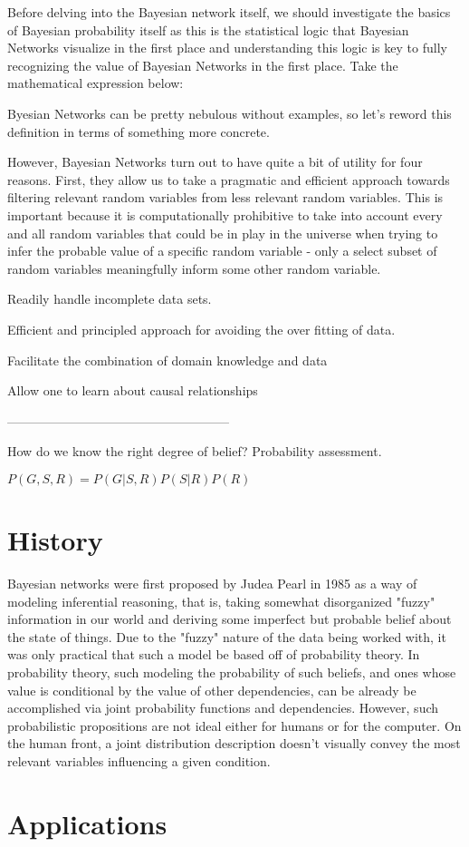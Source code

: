 \documentclass{article}
\begin{document}
Before delving into the Bayesian network itself, we should investigate the basics of Bayesian probability itself as this is the statistical logic that Bayesian Networks visualize in the first place and understanding this logic is key to fully recognizing the value of Bayesian Networks in the first place. Take the mathematical expression below:


Byesian Networks can be pretty nebulous without examples, so let's reword this definition in terms of something more concrete.

However, Bayesian Networks turn out to have quite a bit of utility for four reasons\cite{}. First, they allow us to take a pragmatic and efficient approach towards filtering relevant random variables from less relevant random variables. This is important because it is computationally prohibitive to take into account every and all random variables that could be in play in the universe when trying to infer the probable value of a specific random variable - only a select subset of random variables meaningfully inform some other random variable.

Readily handle incomplete data sets.


Efficient and principled approach for avoiding the over fitting of data.

Facilitate the combination of domain knowledge and data

Allow one to learn about causal relationships

-----------------------------------------------------

How do we know the right degree of belief? Probability assessment.

$P(G,S,R)=P(G|S,R)P(S|R)P(R)$

\section{History}

Bayesian networks were first proposed by Judea Pearl in 1985 as a way of modeling inferential reasoning, that is, taking somewhat disorganized "fuzzy" information in our world and deriving some imperfect but probable belief about the state of things. Due to the "fuzzy" nature of the data being worked with, it was only practical that such a model be based off of probability theory. In probability theory, such modeling the probability of such beliefs, and ones whose value is conditional by the value of other dependencies, can be already be accomplished via joint probability functions and dependencies. However, such probabilistic propositions are not ideal either for humans or for the computer. On the human front, a joint distribution description doesn't visually convey the most relevant variables influencing a given condition. 

\cite{murphy02}

\section{Applications}



\end{document}
